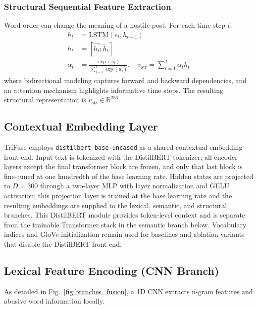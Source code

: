 \subsubsection{Structural Sequential Feature Extraction}

Word order can change the meaning of a hostile post. For each time step $t$:
\begin{equation}
\begin{aligned}
h_t &= \mathrm{LSTM}(e_t, h_{t-1}) \\
h_t &= [\overrightarrow{h_t}; \overleftarrow{h_t}] \\
\alpha_t &= \frac{\exp(u_t)}{\sum_{j=1}^{L} \exp(u_j)}, \quad
v_{\mathrm{str}} = \sum_{t=1}^{L} \alpha_t h_t
\end{aligned}
\end{equation}
where bidirectional modeling captures forward and backward dependencies, and an attention mechanism \cite{ref30} highlights informative time steps. The resulting structural representation is $v_{\mathrm{str}} \in \mathbb{R}^{256}$.

\subsection{Contextual Embedding Layer}

TriFuse employs \texttt{distilbert-base-uncased} as a shared contextual embedding front end. Input text is tokenized with the DistilBERT tokenizer; all encoder layers except the final transformer block are frozen, and only that last block is fine-tuned at one hundredth of the base learning rate. Hidden states are projected to $D=300$ through a two-layer MLP with layer normalization and GELU activation; this projection layer is trained at the base learning rate and the resulting embeddings are supplied to the lexical, semantic, and structural branches. This DistilBERT module provides token-level context and is separate from the trainable Transformer stack in the semantic branch below. Vocabulary indices and GloVe initialization remain used for baselines and ablation variants that disable the DistilBERT front end.

\subsection{Lexical Feature Encoding (CNN Branch)}

As detailed in Fig.~\ref{fig:branches_fusion}, a 1D CNN extracts n-gram features and abusive word information locally.

